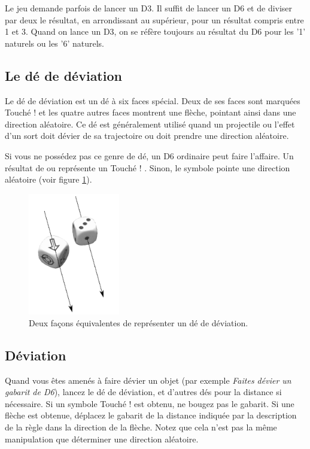 Le jeu demande parfois de lancer un D3. Il suffit de lancer un D6 et de diviser par deux le résultat, en arrondissant au supérieur, pour un résultat compris entre 1 et 3. Quand on lance un D3, on se réfère toujours au résultat du D6 pour les '1' naturels ou les '6' naturels.

\subsection{Le dé de déviation}

Le dé de déviation est un dé à six faces spécial. Deux de ses faces sont marquées \og Touché ! \fg{} et les quatre autres faces montrent une flèche, pointant ainsi dans une direction aléatoire. Ce dé est généralement utilisé quand un projectile ou l'effet d'un sort doit dévier de sa trajectoire ou doit prendre une direction aléatoire.

Si vous ne possédez pas ce genre de dé, un D6 ordinaire peut faire l'affaire. Un résultat de  ou  représente un \og Touché ! \fg . Sinon, le symbole  pointe une direction aléatoire (voir figure \ref{figure/de_deviation}).

\begin{figure}[!htbp]
\centering
\includegraphics[width=4cm]{de_deviation.png}
\caption{Deux façons équivalentes de représenter un dé de déviation.}
\label{figure/de_deviation}
\end{figure}

\subsection{Déviation}

Quand vous êtes amenés à faire dévier un objet (par exemple \emph{Faites dévier un gabarit de \unit{D6}{\pouce}}), lancez le dé de déviation, et d'autres dés pour la distance si nécessaire. Si un symbole \og Touché ! \fg{} est obtenu, ne bougez pas le gabarit. Si une flèche est obtenue, déplacez le gabarit de la distance indiquée par la description de la règle dans la direction de la flèche. Notez que cela n'est pas la même manipulation que déterminer une direction aléatoire.

